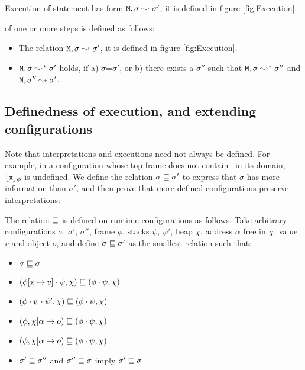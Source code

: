 Execution of statement has   form ${\mbox{\tt{\ensuremath{{\mbox{\tt{M}}}}}}}, \sigma \leadsto \sigma'$, it is defined in figure \ref{fig:Execution}.

\begin{definition}[Execution] of one or more steps is defined as follows:

\begin{itemize}
     \item 
   The relation ${\mbox{\tt{\ensuremath{{\mbox{\tt{M}}}}}}}, \sigma \leadsto \sigma'$, it is defined in figure \ref{fig:Execution}.
   \item
   ${\mbox{\tt{\ensuremath{{\mbox{\tt{M}}}}}}}, \sigma \leadsto^* \sigma'$ holds, if a) $\sigma$=$\sigma'$, or b) there exists a $\sigma''$ such that
   ${\mbox{\tt{\ensuremath{{\mbox{\tt{M}}}}}}}, \sigma \leadsto^* \sigma''$ and ${\mbox{\tt{\ensuremath{{\mbox{\tt{M}}}}}}}, \sigma'' \leadsto \sigma'$.
 \end{itemize}

\end{definition}

\subsection{Definedness of execution, and extending configurations}

Note that interpretations and executions need not always be defined. 
For example, in a configuration whose top frame does not contain \x\,  in its domain, ${\lfloor{ {{\mbox{\tt{x}}}}}\rfloor_{\phi}} $ is undefined. We define the relation $\sigma \sqsubseteq \sigma'$ to express that   $\sigma$ has more information than $\sigma'$, and then prove that more defined configurations preserve interpretations:

\begin{definition}
The relation $\sqsubseteq$   is defined on runtime configurations as follows. Take arbitrary 
configurations $\sigma$, $\sigma'$, $\sigma''$, frame $\phi$, stacks $\psi$, $\psi'$,  heap $\chi$, address $\alpha$ free in $\chi$, value $v$ and object $o$, and define $\sigma  \sqsubseteq \sigma'$ as the smallest relation such that:

\begin{itemize}
\item 
$\sigma  \sqsubseteq \sigma$
\item
$(\phi[{\mbox{\tt{x}}} \mapsto v]\cdot \psi, \chi) \sqsubseteq  (\phi\cdot \psi, \chi)$ 
\item
$(\phi\cdot\psi\cdot\psi', \chi) \sqsubseteq  (\phi\cdot \psi, \chi)$ 
\item
$(\phi, \chi[\alpha \mapsto o) \sqsubseteq  (\phi\cdot \psi, \chi)$ 
\item
$(\phi, \chi[\alpha \mapsto o) \sqsubseteq  (\phi\cdot \psi, \chi)$ 
\item
$\sigma'  \sqsubseteq \sigma''$ and $\sigma''  \sqsubseteq \sigma$ imply $\sigma'  \sqsubseteq \sigma$
\end{itemize}
\end{definition}


